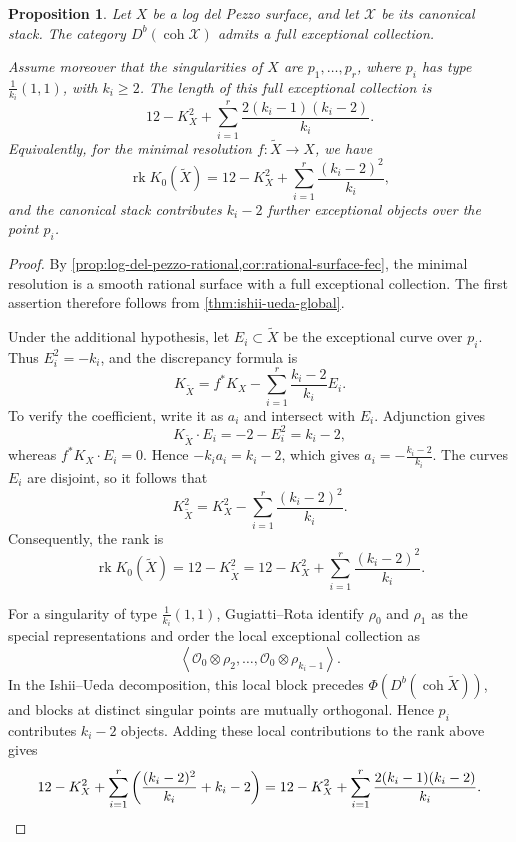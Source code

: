 \documentclass[11pt]{article}
\theoremstyle{plain}
\newtheorem{proposition}[proposition]{Proposition}
\theoremstyle{definition}
\theoremstyle{remark}
\newcommand{\Db}{D^b}
\newcommand{\coh}{\operatorname{coh}}
\newcommand{\rk}{\operatorname{rk}}
\newcommand{\XX}{\mathcal X}
\newcommand{\OO}{\mathcal O}
\begin{document}
\begin{proposition}\label{prop:general-log-del-pezzo-stack}
Let \(X\) be a log del Pezzo surface, and let \(\XX\) be its canonical stack. The category \(\Db(\coh \XX)\) admits a full exceptional collection.

Assume moreover that the singularities of \(X\) are \(p_1,\dots,p_r\), where \(p_i\) has type \(\frac1{k_i}(1,1)\), with \(k_i\geq 2\). The length of this full exceptional collection is
\[
12-K_X^2
+
\sum_{i=1}^r
\frac{2(k_i-1)(k_i-2)}{k_i}.
\]
Equivalently, for the minimal resolution \(f:\widetilde X\to X\), we have
\[
\rk K_0(\widetilde X)
=
12-K_X^2
+
\sum_{i=1}^r
\frac{(k_i-2)^2}{k_i},
\]
and the canonical stack contributes \(k_i-2\) further exceptional objects over the point \(p_i\).
\end{proposition}

\begin{proof}
By \cref{prop:log-del-pezzo-rational,cor:rational-surface-fec}, the minimal
resolution is a smooth rational surface with a full exceptional collection.
The first assertion therefore follows from \cref{thm:ishii-ueda-global}.

Under the additional hypothesis, let \(E_i\subset\widetilde X\) be the
exceptional curve over \(p_i\). Thus \(E_i^2=-k_i\), and the discrepancy
formula is
\[
K_{\widetilde X}
=
f^*K_X-\sum_{i=1}^r\frac{k_i-2}{k_i}E_i.
\]
To verify the coefficient, write it as \(a_i\) and intersect with \(E_i\).
Adjunction gives
\[
K_{\widetilde X}\cdot E_i
=
-2-E_i^2
=k_i-2,
\]
whereas \(f^*K_X\cdot E_i=0\). Hence
\(-k_ia_i=k_i-2\), which gives
\(a_i=-\frac{k_i-2}{k_i}\). The curves \(E_i\) are disjoint, so it
follows that
\[
K_{\widetilde X}^2
=
K_X^2-\sum_{i=1}^r\frac{(k_i-2)^2}{k_i}.
\]
Consequently, the rank is
\[
\rk K_0(\widetilde X)
=
12-K_{\widetilde X}^2
=
12-K_X^2
+
\sum_{i=1}^r
\frac{(k_i-2)^2}{k_i}.
\]

For a singularity of type \(\frac1{k_i}(1,1)\), Gugiatti--Rota
\cite[Example~2.6]{GugiattiRota2023} identify
\(\rho_0\) and \(\rho_1\) as the special representations and order the local
exceptional collection as
\[
\left\langle
\OO_0\otimes\rho_2,\dots,\OO_0\otimes\rho_{k_i-1}
\right\rangle.
\]
In the Ishii--Ueda decomposition,
this local block precedes
\(\Phi(\Db(\coh\widetilde X))\), and blocks at distinct singular points are
mutually orthogonal. Hence \(p_i\) contributes \(k_i-2\) objects. Adding
these local contributions to the rank above gives
\[
12-K_X^2
+
\sum_{i=1}^r
\left(
\frac{(k_i-2)^2}{k_i}+k_i-2
\right)
=
12-K_X^2
+
\sum_{i=1}^r
\frac{2(k_i-1)(k_i-2)}{k_i}.\qedhere
\]
\end{proof}
\end{document}
